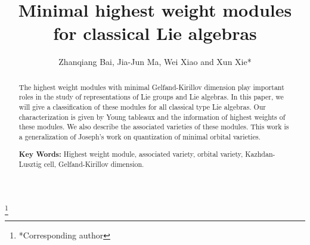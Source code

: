\documentclass{amsart}[12pt]
\numberwithin{equation}{section}
\begin{document}
\title[Minimal highest weight modules]{Minimal highest weight modules for classical Lie algebras}

\author{ Zhanqiang Bai, Jia-Jun Ma, Wei Xiao and Xun Xie*}

\address[Bai]{School of Mathematical Sciences, Soochow University, Suzhou 215006, P. R. China}


\address[Ma]{School of Mathematical Sciences, Shanghai Jiao Tong University, 800 Dongchuan Rd Shanghai 200240, P. R. China}


\address[Xiao]{College of Mathematics and statistics, Shenzhen Key Laboratory of Advanced Machine Learning and Applications, Shenzhen University,
Shenzhen 518060, Guangdong, P. R. China}




\address[Xie]{School of Mathematics and Statistics, Beijing
Institute of Technology, Beijing 100081, P. R. China}
%
\thanks{*Corresponding author}



\date{}
\maketitle


\begin{abstract}
The highest weight modules with minimal Gelfand-Kirillov dimension play important roles in the study of representations of Lie groups and Lie algebras. In this paper, we will give a classification of these modules for all classical type Lie algebras. Our characterization is given by Young tableaux and the information of highest weights of these modules. We also describe the associated varieties of these modules. This work is a generalization of Joseph's work on quantization of minimal orbital varieties.




{\bf Key Words:} Highest weight module, associated variety, orbital variety, Kazhdan-Lusztig cell, Gelfand-Kirillov dimension.

\end{abstract}
\end{document}
